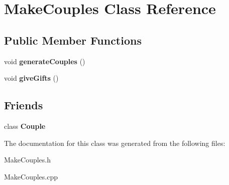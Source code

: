 \hypertarget{class_make_couples}{}\section{Make\+Couples Class Reference}
\label{class_make_couples}
\subsection*{Public Member Functions}
\begin{DoxyCompactItemize}
\item 
\mbox{\label{class_make_couples_ada939d38013b761a0745620ce2e57195}} 
void {\bfseries generate\+Couples} ()
\item 
\mbox{\label{class_make_couples_a55984a015f74fa6752dba1d9e014ba58}} 
void {\bfseries give\+Gifts} ()
\end{DoxyCompactItemize}
\subsection*{Friends}
\begin{DoxyCompactItemize}
\item 
\mbox{\label{class_make_couples_a94ec3d69c6a9671cf7d5967498c81a90}} 
class {\bfseries Couple}
\end{DoxyCompactItemize}


The documentation for this class was generated from the following files\+:\begin{DoxyCompactItemize}
\item 
Make\+Couples.\+h\item 
Make\+Couples.\+cpp\end{DoxyCompactItemize}
